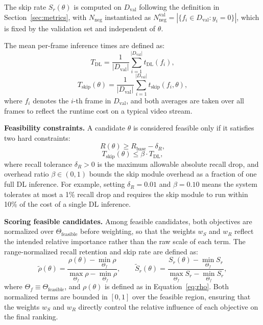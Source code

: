 The skip rate $S_r(\theta)$ is computed on $D_{\text{val}}$ following the
definition in Section~\ref{sec:metrics}, with $N_{\text{neg}}$ instantiated as
$N_{\text{neg}}^{\text{val}} = |\{f_i \in D_{\text{val}} : y_i = 0\}|$, which
is fixed by the validation set and independent of $\theta$.

The mean per-frame inference times are defined as:
\begin{equation}
    T_{\text{DL}} = \frac{1}{|D_{\text{val}}|}
    \sum_{i=1}^{|D_{\text{val}}|} t_{\text{DL}}(f_i),
\end{equation}
\begin{equation}
    T_{\text{skip}}(\theta) = \frac{1}{|D_{\text{val}}|}
    \sum_{i=1}^{|D_{\text{val}}|} t_{\text{skip}}(f_i, \theta),
\end{equation}
where $f_i$ denotes the $i$-th frame in $D_{\text{val}}$, and both averages are
taken over all frames to reflect the runtime cost on a typical video stream.

\textbf{Feasibility constraints.} A candidate $\theta$ is considered feasible
only if it satisfies two hard constraints:
\begin{equation}
    R(\theta) \geq R_{\text{base}} - \delta_R,
\end{equation}
\begin{equation}
    T_{\text{skip}}(\theta) \leq \beta \cdot T_{\text{DL}},
\end{equation}
where recall tolerance $\delta_R > 0$ is the maximum allowable absolute recall
drop, and overhead ratio $\beta \in (0, 1)$ bounds the skip module overhead as
a fraction of one full DL inference. For example, setting $\delta_R = 0.01$ and
$\beta = 0.10$ means the system tolerates at most a 1\% recall drop and requires
the skip module to run within 10\% of the cost of a single DL inference.

\textbf{Scoring feasible candidates.}
Among feasible candidates, both objectives are normalized over
$\Theta_{\text{feasible}}$ before weighting, so that the weights
$w_S$ and $w_R$ reflect the intended relative importance rather
than the raw scale of each term.
The range-normalized recall retention and skip rate are defined as:
\begin{equation}
    \tilde{\rho}(\theta)
    = \frac{\rho(\theta) - \min_{\Theta_f}\rho}
           {\max_{\Theta_f}\rho - \min_{\Theta_f}\rho},
    \qquad
    \tilde{S}_r(\theta)
    = \frac{S_r(\theta) - \min_{\Theta_f}S_r}
           {\max_{\Theta_f}S_r  - \min_{\Theta_f}S_r},
\end{equation}
where $\Theta_f \equiv \Theta_{\text{feasible}}$,
and $\rho(\theta)$ is defined as in Equation~\eqref{eq:rho}.
Both normalized terms are bounded in $[0, 1]$ over the feasible
region, ensuring that the weights $w_S$ and $w_R$ directly control
the relative influence of each objective on the final ranking.

